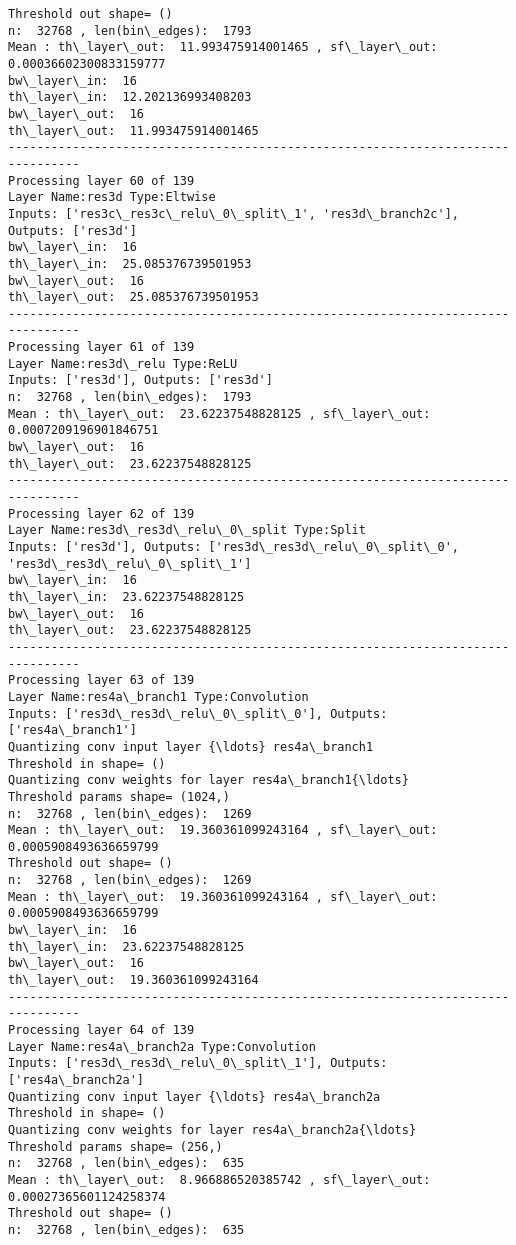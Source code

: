 \documentclass[11pt]{article}
\begin{document}
\begin{Verbatim}[commandchars=\\\{\}]
Threshold out shape= ()
n:  32768 , len(bin\_edges):  1793
Mean : th\_layer\_out:  11.993475914001465 , sf\_layer\_out:  0.00036602300833159777
bw\_layer\_in:  16
th\_layer\_in:  12.202136993408203
bw\_layer\_out:  16
th\_layer\_out:  11.993475914001465
--------------------------------------------------------------------------------
Processing layer 60 of 139
Layer Name:res3d Type:Eltwise
Inputs: ['res3c\_res3c\_relu\_0\_split\_1', 'res3d\_branch2c'], Outputs: ['res3d']
bw\_layer\_in:  16
th\_layer\_in:  25.085376739501953
bw\_layer\_out:  16
th\_layer\_out:  25.085376739501953
--------------------------------------------------------------------------------
Processing layer 61 of 139
Layer Name:res3d\_relu Type:ReLU
Inputs: ['res3d'], Outputs: ['res3d']
n:  32768 , len(bin\_edges):  1793
Mean : th\_layer\_out:  23.62237548828125 , sf\_layer\_out:  0.0007209196901846751
bw\_layer\_out:  16
th\_layer\_out:  23.62237548828125
--------------------------------------------------------------------------------
Processing layer 62 of 139
Layer Name:res3d\_res3d\_relu\_0\_split Type:Split
Inputs: ['res3d'], Outputs: ['res3d\_res3d\_relu\_0\_split\_0', 'res3d\_res3d\_relu\_0\_split\_1']
bw\_layer\_in:  16
th\_layer\_in:  23.62237548828125
bw\_layer\_out:  16
th\_layer\_out:  23.62237548828125
--------------------------------------------------------------------------------
Processing layer 63 of 139
Layer Name:res4a\_branch1 Type:Convolution
Inputs: ['res3d\_res3d\_relu\_0\_split\_0'], Outputs: ['res4a\_branch1']
Quantizing conv input layer {\ldots} res4a\_branch1
Threshold in shape= ()
Quantizing conv weights for layer res4a\_branch1{\ldots}
Threshold params shape= (1024,)
n:  32768 , len(bin\_edges):  1269
Mean : th\_layer\_out:  19.360361099243164 , sf\_layer\_out:  0.0005908493636659799
Threshold out shape= ()
n:  32768 , len(bin\_edges):  1269
Mean : th\_layer\_out:  19.360361099243164 , sf\_layer\_out:  0.0005908493636659799
bw\_layer\_in:  16
th\_layer\_in:  23.62237548828125
bw\_layer\_out:  16
th\_layer\_out:  19.360361099243164
--------------------------------------------------------------------------------
Processing layer 64 of 139
Layer Name:res4a\_branch2a Type:Convolution
Inputs: ['res3d\_res3d\_relu\_0\_split\_1'], Outputs: ['res4a\_branch2a']
Quantizing conv input layer {\ldots} res4a\_branch2a
Threshold in shape= ()
Quantizing conv weights for layer res4a\_branch2a{\ldots}
Threshold params shape= (256,)
n:  32768 , len(bin\_edges):  635
Mean : th\_layer\_out:  8.966886520385742 , sf\_layer\_out:  0.00027365601124258374
Threshold out shape= ()
n:  32768 , len(bin\_edges):  635

\end{Verbatim}
\end{document}
